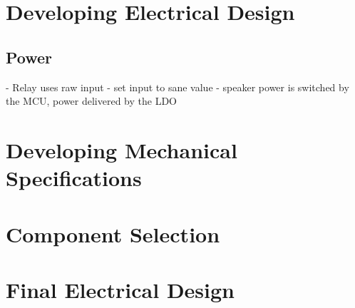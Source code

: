 \documentclass[12pt]{article}
\begin{document}
	
	
	\section{Developing Electrical Design\label{sec:devel-electr-design}} 
	\subsection{Power}
  

  - Relay uses raw input - set input to sane value
  - speaker power is switched by the MCU, power delivered by the LDO
	
	\section{Developing Mechanical Specifications}
	
	
	\section{Component Selection}
	
	\section{Final Electrical Design}
	
	
    \printglossaries
    
    \printbibliography[heading=bibintoc]
	
\end{document}
